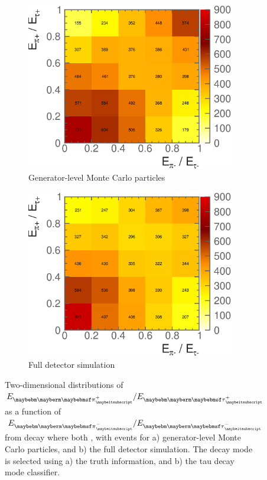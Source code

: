 \begin{figure}[htbp]
\centering %
\begin{subfigure}[b]{0.75\textwidth}
  \includegraphics[width=\textwidth]{tau/NoTimeAnalysis/2DMC}
  \caption{Generator-level  Monte Carlo particles}
  \label{fig:TauSpin2DMC}
\end{subfigure}
\begin{subfigure}[b]{0.75\textwidth}
  \includegraphics[width=\textwidth]{tau/NoTimeAnalysis/2Dreco}
  \caption{Full detector simulation}
  \label{fig:TauSpin2Dreco}
\end{subfigure}
\caption
{Two-dimensional distributions of $E_{\Ppiplus}/E_{\APtauon}$ as a function of $E_{\Ppiminus}/E_{\Ptauon}$ from \ZToTauTau decay where both \tauToPionBoth, with \eeZZQQ events for a) generator-level  Monte Carlo particles, and b) the full detector simulation. The \tauToPionBoth decay mode is selected using a) the truth information, and b) the tau decay mode classifier.}
\label{fig:TauSpin2D}
\end{figure}
